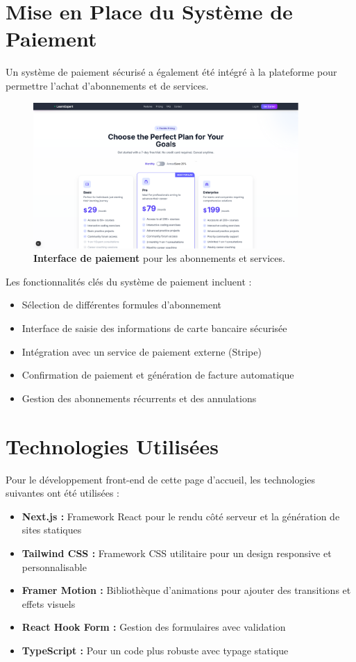 \section{Mise en Place du Système de Paiement}

Un système de paiement sécurisé a également été intégré à la plateforme pour permettre l'achat d'abonnements et de services.

\begin{figure}[h!]
  \centering
  \includegraphics[width=0.9\textwidth,keepaspectratio]{week_2_img/payment_1.png}
  \caption{\textbf{Interface de paiement} pour les abonnements et services.}
  \label{fig:payment}
\end{figure}

Les fonctionnalités clés du système de paiement incluent :
\begin{itemize}
  \item Sélection de différentes formules d'abonnement
  \item Interface de saisie des informations de carte bancaire sécurisée
  \item Intégration avec un service de paiement externe (Stripe)
  \item Confirmation de paiement et génération de facture automatique
  \item Gestion des abonnements récurrents et des annulations
\end{itemize}

\section{Technologies Utilisées}

Pour le développement front-end de cette page d'accueil, les technologies suivantes ont été utilisées :
\begin{itemize}
  \item \textbf{Next.js :} Framework React pour le rendu côté serveur et la génération de sites statiques
  \item \textbf{Tailwind CSS :} Framework CSS utilitaire pour un design responsive et personnalisable
  \item \textbf{Framer Motion :} Bibliothèque d'animations pour ajouter des transitions et effets visuels
  \item \textbf{React Hook Form :} Gestion des formulaires avec validation
  \item \textbf{TypeScript :} Pour un code plus robuste avec typage statique
\end{itemize}

